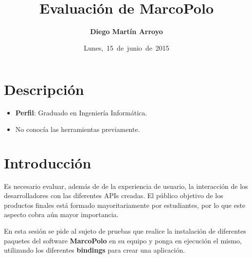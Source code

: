 
\usepackage{xcolor}

\newcommand{\hmwkTitle}{Evaluación de MarcoPolo} %
\newcommand{\hmwkDueDate}{Lunes,\ 15\ de\ junio\ de\ 2015}
\newcommand{\hmwkClassInstructor}{Rodrigo Santamaría} %
\newcommand{\hmwkAuthorName}{Diego Martín Arroyo} %
\newcommand{\hmwkSubject}{6} %

\newcommand{\ordinalindicator}{\hspace{-1.5mm}$\phantom{a}^{\circ}$}
\title{\hmwkTitle}
\author{\textbf{\hmwkAuthorName}}
\date{\hmwkDueDate}


\maketitle

\tableofcontents


\section{Descripción}

\begin{itemize}
 	\item \textbf{Perfil}: Graduado en Ingeniería Informática.
 	\item No conocía las herramientas previamente.
\end{itemize}


\section{Introducción}

Es necesario evaluar, además de de la experiencia de usuario, la interacción de los desarrolladores con las diferentes APIs creadas. El público objetivo de los productos finales está formado mayoritariamente por estudiantes, por lo que este aspecto cobra aún mayor importancia.

En esta sesión se pide al sujeto de pruebas que realice la instalación de diferentes paquetes del software \textbf{MarcoPolo} en su equipo y ponga en ejecución el mismo, utilizando los diferentes \textbf{bindings} para crear una aplicación.

